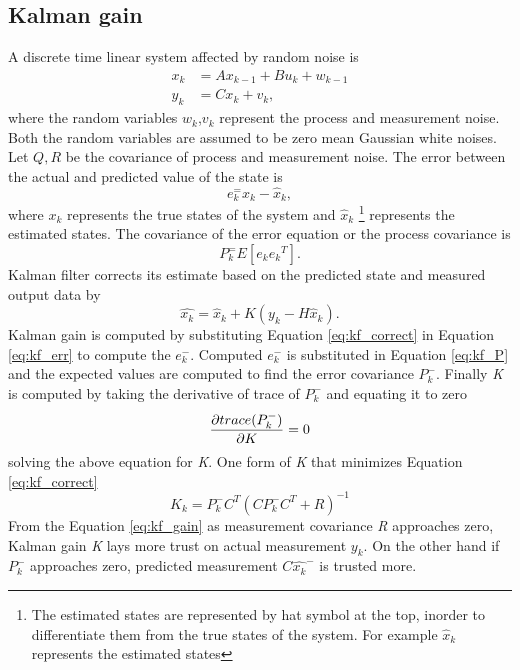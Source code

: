 \subsection{Kalman gain}
A discrete time linear system affected by random noise is
\begin{equation}
    \begin{split}
        \label{eq:lin_ss}
        x_{k} &= Ax_{k-1} + Bu_k + w_{k-1}\\
        y_k &= Cx_k + v_k,
    \end{split}
\end{equation}
where the random variables $w_k$,$v_k$ represent the process and measurement noise. Both the random variables are assumed to be zero mean Gaussian white noises. Let $Q,R$ be the covariance of process and measurement noise. The error between the actual and predicted value of the state is \citep{gre01}
\begin{equation}\label{eq:kf_err}
e_k^ = x_k - \hat{x}_k,
\end{equation} 
where $x_k$ represents the true states of the system and $\hat x_k$ \footnote{ The estimated states are represented by hat symbol at the top, inorder to differentiate them from the true states of the system. For example $\hat x_k$ represents the estimated states} represents the estimated states.
The covariance of the error equation or the process covariance is 
\begin{equation}\label{eq:kf_P}
P_k^ = E[e_k {e_k}^T].
\end{equation} Kalman filter corrects its estimate based on the predicted state and measured output data by 
\begin{equation} \label{eq:kf_correct}
\hat{x_k} = \hat{x}_k + K(y_k - H\hat x_k).
\end{equation}
Kalman gain is computed by substituting Equation \ref{eq:kf_correct} in Equation \ref{eq:kf_err} to compute the $e_k^-$. Computed $e_k^-$ is substituted in Equation \ref{eq:kf_P} and the expected values are computed to find the error covariance $P_k^-$. Finally \emph{K} is computed by taking the derivative of trace of $P_k^-$ and equating it to zero $$ \frac{\partial {trace(P_k^-)}}{\partial {K}} = 0 $$ solving the above equation for \emph{K}. One form of \emph{K} that minimizes Equation \ref{eq:kf_correct}
\begin{equation} \label{eq:kf_gain}
 K_k = P_k^- C^T(C P_k^- C^T + R)^{-1}
    \end{equation}
From the Equation \ref{eq:kf_gain} as measurement covariance \emph{R} approaches zero, Kalman gain \emph{K} lays more trust on actual measurement $y_k$. On the other hand if $P_k^-$ approaches zero, predicted measurement $C\hat{x_k}^-$ is trusted more.


